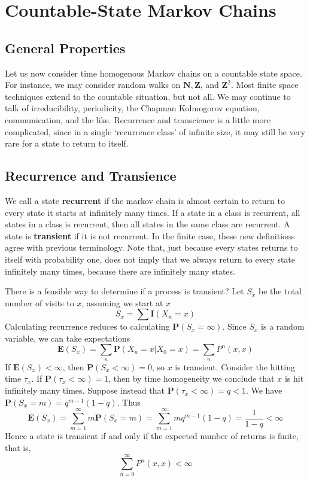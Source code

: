 \chapter{Countable-State Markov Chains}

\section{General Properties}

Let us now consider time homogenous Markov chains on a countable state space. For instance, we may consider random walks on $\mathbf{N}, \mathbf{Z}$, and $\mathbf{Z}^2$. Most finite space techniques extend to the countable situation, but not all. We may continue to talk of irreducibility, periodicity, the Chapman Kolmogorov equation, communication, and the like. Recurrence and transcience is a little more complicated, since in a single `recurrence class' of infinite size, it may still be very rare for a state to return to itself.

\section{Recurrence and Transience}

We call a state {\bf recurrent} if the markov chain is almost certain to return to every state it starts at infinitely many times. If a state in a class is recurrent, all states in a class is recurrent, then all states in the same class are recurrent. A state is {\bf transient} if it is not recurrent. In the finite case, these new definitions agree with previous terminology. Note that, just because every states returns to itself with probability one, does not imply that we always return to every state infinitely many times, because there are infinitely many states.

There is a feasible way to determine if a process is transient? Let $S_x$ be the total number of visits to $x$, assuming we start at $x$
%
\[ S_x = \sum \mathbf{I}(X_n = x) \]
%
Calculating recurrence reduces to calculating $\mathbf{P}(S_x = \infty)$. Since $S_x$ is a random variable, we can take expectations
%
\[ \mathbf{E}(S_x) = \sum_n \mathbf{P}(X_n = x | X_0 = x) = \sum_n P^n(x,x) \]
%
If $\mathbf{E}(S_x) < \infty$, then $\mathbf{P}(S_x < \infty) = 0$, so $x$ is transient. Consider the hitting time $\tau_x$. If $\mathbf{P}(\tau_x < \infty) = 1$, then by time homogeneity we conclude that $x$ is hit infinitely many times. Suppose instead that $\mathbf{P}(\tau_x < \infty) = q < 1$. We have $\mathbf{P}(S_x = m) = q^{m-1}(1-q)$. Thus
%
\[ \mathbf{E}(S_x) = \sum_{m = 1}^\infty m \mathbf{P}(S_x = m) = \sum_{m = 1}^\infty mq^{m-1}(1 - q) = \frac{1}{1-q} < \infty \]
%
Hence a state is transient if and only if the expected number of returns is finite, that is,
%
\[ \sum_{n = 0}^\infty P^n(x,x) < \infty \]

